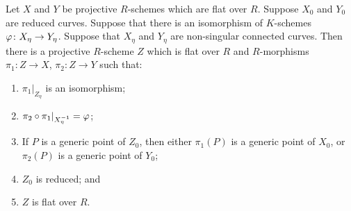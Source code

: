 \documentclass[12pt]{memoir}
\begin{document}
\begin{Lem}\label{lem:4.4}
Let $X$ and $Y$ be projective $R$-schemes which are flat over $R$. Suppose $X_0$ and $Y_0$ are reduced curves. Suppose that there is an isomorphism of $K$-schemes $\varphi\colon X_\eta \to Y_\eta$. Suppose that $X_\eta$ and $Y_\eta$ are non-singular connected curves. Then there is a projective $R$-scheme $Z$ which is flat over $R$ and $R$-morphisms $\pi_1\colon Z \to X$, $\pi_2\colon Z \to Y$ such that:

\begin{enumerate}[\upshape(i)]
\item $\pi_1|_{Z_\eta}$ is an isomorphism;
\item $\pi_2 \circ \pi_1|_{X_\eta^{-1}} = \varphi$;
\item If $P$ is a generic point of $Z_0$, then either $\pi_1(P)$ is a generic point of $X_0$, or $\pi_2(P)$ is a generic point of $Y_0$;
\item $Z_0$ is reduced; and
\item $Z$ is flat over $R$.
\end{enumerate}
\end{Lem}
\end{document}

